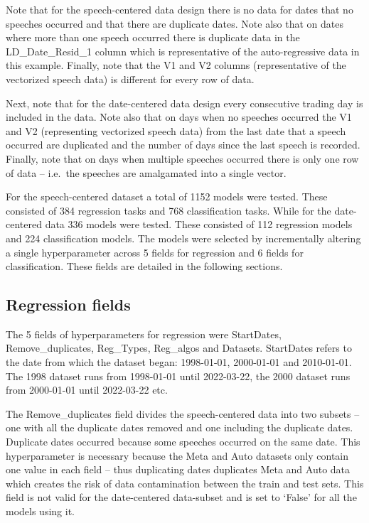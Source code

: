 \documentclass[11pt,preprint, authoryear]{elsarticle}
\numberwithin{equation}{section}
\numberwithin{figure}{section}
\numberwithin{table}{section}
\begin{document}
Note that for the speech-centered data design there is no data for dates
that no speeches occurred and that there are duplicate dates. Note also
that on dates where more than one speech occurred there is duplicate
data in the LD\_Date\_Resid\_1 column which is representative of the
auto-regressive data in this example. Finally, note that the V1 and V2
columns (representative of the vectorized speech data) is different for
every row of data.

Next, note that for the date-centered data design every consecutive
trading day is included in the data. Note also that on days when no
speeches occurred the V1 and V2 (representing vectorized speech data)
from the last date that a speech occurred are duplicated and the number
of days since the last speech is recorded. Finally, note that on days
when multiple speeches occurred there is only one row of data --
i.e.~the speeches are amalgamated into a single vector.

For the speech-centered dataset a total of 1152 models were tested.
These consisted of 384 regression tasks and 768 classification tasks.
While for the date-centered data 336 models were tested. These consisted
of 112 regression models and 224 classification models. The models were
selected by incrementally altering a single hyperparameter across 5
fields for regression and 6 fields for classification. These fields are
detailed in the following sections.

\hypertarget{regression-fields}{%
\subsection{Regression fields}\label{regression-fields}}

The 5 fields of hyperparameters for regression were StartDates,
Remove\_duplicates, Reg\_Types, Reg\_algos and Datasets. StartDates
refers to the date from which the dataset began: 1998-01-01, 2000-01-01
and 2010-01-01. The 1998 dataset runs from 1998-01-01 until 2022-03-22,
the 2000 dataset runs from 2000-01-01 until 2022-03-22 etc.

The Remove\_duplicates field divides the speech-centered data into two
subsets -- one with all the duplicate dates removed and one including
the duplicate dates. Duplicate dates occurred because some speeches
occurred on the same date. This hyperparameter is necessary because the
Meta and Auto datasets only contain one value in each field -- thus
duplicating dates duplicates Meta and Auto data which creates the risk
of data contamination between the train and test sets. This field is not
valid for the date-centered data-subset and is set to `False' for all
the models using it.
\end{document}
